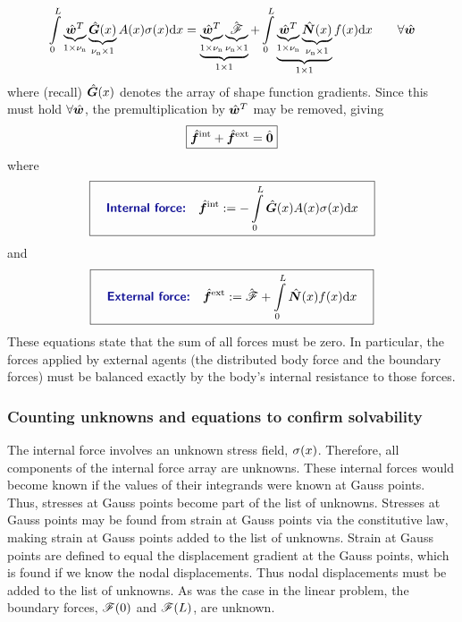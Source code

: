 \begin{equation}
 \int\limits_0^L \underbrace{\hat{\bm{w}}^T}_{1\times{\nu_\text{n}}}\underbrace{\hat{\bm{G}}(x)}_{{\nu_\text{n}}\times1} A(x) {\sigma}(x) \mathrm{d} x 
= 
\underbrace{\underbrace{\hat{\bm{w}}^T}_{1\times{\nu_\text{n}}}\underbrace{\hat{\bm{\mathscr{F}}}}_{{\nu_\text{n}}\times1}}_{1\times1}
+  \int\limits_0^L \underbrace{\underbrace{\hat{\bm{w}}^T}_{1\times{\nu_\text{n}}}\underbrace{\hat{\bm{N}}(x)}_{{\nu_\text{n}}\times1}}_{1\times1}f(x)
\mathrm{d} x
 \qquad\forall\hat{\bm{w}}
\label{eq:nonLinearBarWeakFormWithForces}
\end{equation}
where (recall) $\hat{\bm{G}}(x)$ denotes the array of shape function gradients.
Since this must hold $\forall\hat{\bm{w}}$, the premultiplication by $\hat{\bm{w}}^T$ may be removed, giving
\begin{equation}
 \boxed{\hat{\bm{f}}^\text{int} +  \hat{\bm{f}}^\text{ext} = \hat{\bm{0}}}
\label{eq:nonLinearBarWeakFormWithForcesDiscr}
\end{equation}
%
where
\begin{equation}
\boxit{\quad
\text{\Defn{Internal force:}}\quad
  \Array{f}^\text{int}\definedEqual -\int\limits_0^L \gradNBFa(x) A(x) \sig(x) \dd x
\quad}
\label{eq:nonlinearBarInternalForce}
\end{equation}
and
\begin{equation}
\boxit{\quad
\text{\Defn{External force:}}\quad
  \Array{f}^\text{ext}
\definedEqual
\Array{\tractionForce} +  \int\limits_0^L \NBFa(x)f(x)\dd x
\quad}
\label{eq:nonlinearBarExternalForce}
\end{equation}
These equations state that the sum of all forces must be zero. In particular, the forces applied by external agents (the distributed body force and the boundary forces) must be balanced exactly by the body's internal resistance to those forces.



\subsubsection{Counting unknowns and equations to confirm solvability}
The internal force involves an unknown stress field, ${\sigma}(x)$. Therefore, all components of the internal force array are unknowns.  These internal forces would become known if the values of their integrands were known at Gauss points. Thus, stresses at Gauss points become part of the list of unknowns. Stresses at Gauss points may be found from strain at Gauss points via the constitutive law, making strain at Gauss  points added to the list of unknowns. Strain at Gauss points are defined to equal the displacement gradient at the Gauss points, which is found if we know the nodal displacements. Thus nodal displacements must be added to the list of unknowns.  As was the case in the linear problem, the boundary forces, $\mathscr{F}(0)$ and $\mathscr{F}(L)$, are unknown. 

